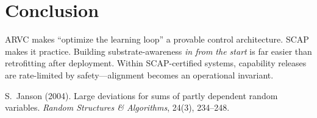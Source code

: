 \documentclass[11pt]{article}
\theoremstyle{definition}
\newcommand{\1}{\mathbf{1}}
\begin{document}
\section{Conclusion}
ARVC makes “optimize the learning loop” a provable control architecture. SCAP makes it practice. Building substrate-awareness \emph{in from the start} is far easier than retrofitting after deployment. Within SCAP-certified systems, capability releases are rate-limited by safety---alignment becomes an operational invariant.

\begin{thebibliography}{9}
S.~Janson (2004).
Large deviations for sums of partly dependent random variables.
\emph{Random Structures \& Algorithms}, 24(3), 234--248.

\end{thebibliography}
\end{document}
